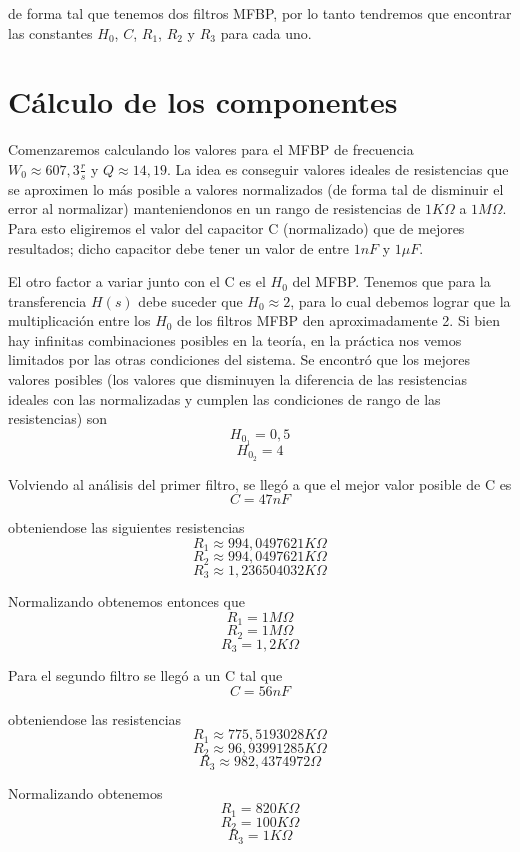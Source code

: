 \documentclass[11pt,a4paper]{report}
\begin{document}
de forma tal que tenemos dos filtros MFBP, por lo tanto tendremos que encontrar las constantes $H_{0}$, $C$, $R_{1}$, $R_{2}$ y $R_{3}$ para cada uno. 

\section*{Cálculo de los componentes}

Comenzaremos calculando los valores para el MFBP de frecuencia \\$W_{0} \approx 607,3 \frac{r}{s}$ y $Q \approx 14,19$. La idea es conseguir valores ideales de resistencias que se aproximen lo más posible a valores normalizados (de forma tal de disminuir el error al normalizar) manteniendonos en un rango de resistencias de $1K\Omega$ a $1M\Omega$.
Para esto eligiremos el valor del capacitor C (normalizado) que de mejores resultados; dicho capacitor debe tener un valor de entre $1nF$ y $1 \mu F$.

\bigskip
El otro factor a variar junto con el C es el $H_{0}$ del MFBP. Tenemos que para la transferencia $H(s)$ debe suceder que $H_{0} \approx 2$, para lo cual debemos lograr que la multiplicación entre los $H_{0}$ de los filtros MFBP den aproximadamente 2. Si bien hay infinitas combinaciones posibles en la teoría, en la práctica nos vemos limitados por las otras condiciones del sistema. Se encontró que los mejores valores posibles (los valores que disminuyen la diferencia de las resistencias ideales con las normalizadas y cumplen las condiciones de rango de las resistencias) son
\[H_{0_{1}} = 0,5\]
\[H_{0_{2}} = 4\]

Volviendo al análisis del primer filtro, se llegó a que el mejor valor posible de C es
\[C = 47nF\]

obteniendose las siguientes resistencias
\[R_{1} \approx 994,0497621K\Omega\]
\[R_{2} \approx 994,0497621K\Omega\]
\[R_{3} \approx 1,236504032K\Omega\]

Normalizando obtenemos entonces que
\[R_{1} = 1M\Omega\]
\[R_{2} = 1M\Omega\]
\[R_{3} = 1,2K\Omega\]

Para el segundo filtro se llegó a un C tal que
\[C = 56nF\]

obteniendose las resistencias
\[R_{1} \approx 775,5193028K\Omega\]
\[R_{2} \approx 96,93991285K\Omega\]
\[R_{3} \approx 982,4374972\Omega\]

Normalizando obtenemos
\[R_{1} = 820K\Omega\]
\[R_{2} = 100K\Omega\]
\[R_{3} = 1K\Omega\]
\end{document}
